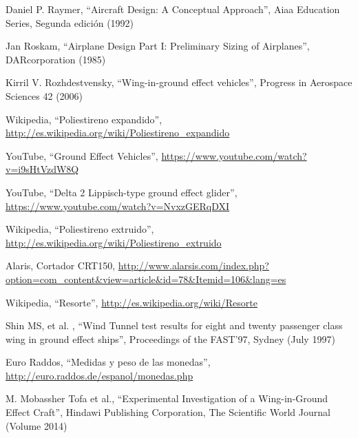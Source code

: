     Daniel P. Raymer,
    “Aircraft Design: A Conceptual Approach”,
    Aiaa Education Series, Segunda edición (1992)

    Jan Roskam,
    “Airplane Design Part I: Preliminary Sizing of Airplanes”,
    DARcorporation (1985)

	Kirril V. Rozhdestvensky,
	“Wing-in-ground effect vehicles”,
	Progress in Aerospace Sciences 42 (2006)
	
	Wikipedia,
	“Poliestireno expandido”,
	\scriptsize \url{http://es.wikipedia.org/wiki/Poliestireno_expandido} \normalsize

	YouTube,
	“Ground Effect Vehicles”,
	\scriptsize \url{https://www.youtube.com/watch?v=i9sHtVzdW8Q} \normalsize
	
	YouTube,
	“Delta 2 Lippisch-type ground effect glider”,
	\scriptsize \url{https://www.youtube.com/watch?v=NvxzGERqDXI} \normalsize
	
	Wikipedia,
	“Poliestireno extruido”,
	\scriptsize \url{http://es.wikipedia.org/wiki/Poliestireno_extruido} \normalsize

	Alaris,
	Cortador CRT150,
	\scriptsize \url{http://www.alarsis.com/index.php?option=com_content&view=article&id=78&Itemid=106&lang=es} \normalsize

	Wikipedia,
	“Resorte”,
	\scriptsize \url{http://es.wikipedia.org/wiki/Resorte} \normalsize
	
	Shin MS, et al. ,
	“Wind Tunnel test results for eight and twenty passenger class wing in ground effect ships”,
	Proceedings of the FAST’97, Sydney (July 1997)

	Euro Raddos,
	“Medidas y peso de las monedas”,
	\scriptsize \url{http://euro.raddos.de/espanol/monedas.php} \normalsize
	
	M. Mobassher Tofa et al.,
	“Experimental Investigation of a Wing-in-Ground Effect Craft”,
	Hindawi Publishing Corporation, The Scientific World Journal (Volume 2014)
	
	

	
	